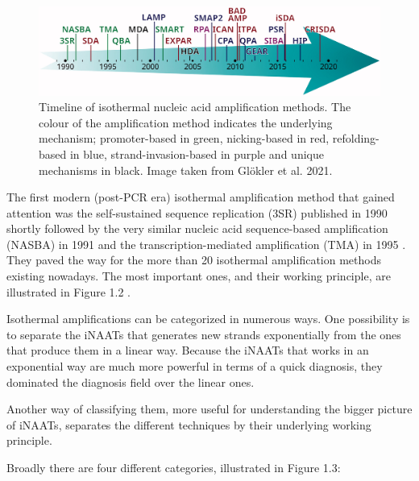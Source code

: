 \begin{figure}[b]
    \centering
    \includegraphics[width=1\textwidth]{data/iso_amp_methods.pdf}
    \caption{Timeline of isothermal nucleic acid amplification methods. The colour of the amplification method indicates the underlying mechanism; promoter-based in green, nicking-based in red, refolding-based in blue, strand-invasion-based in purple and unique mechanisms in black. Image taken from Glökler et al. 2021\cite{glokler_isothermal_2021}.}
    \label{fig:iso_amp_methods}
\end{figure}

The first modern (post-PCR era) isothermal amplification method that gained attention was the self-sustained sequence replication (3SR) published in 1990 \cite{guatelli_isothermal_1990} shortly followed by the very similar nucleic acid sequence-based amplification (NASBA) in 
1991 \cite{compton_nucleic_1991} and the transcription-mediated amplification (TMA) in 1995 \cite{kacian_nucleic_1995}. They paved the way for the more than 20 isothermal amplification methods existing nowadays. The most important ones, and their working principle, are illustrated in Figure 1.2 \cite{glokler_isothermal_2021}.


Isothermal amplifications can be categorized in numerous ways. One possibility is to separate the iNAATs that generates new strands exponentially from the ones that produce them in a linear way. Because the iNAATs that works in an exponential way are much more powerful in terms of a quick diagnosis, they dominated the diagnosis field over the linear ones.

Another way of classifying them, more useful for understanding the bigger picture of iNAATs, separates the different techniques by their underlying working principle\cite{glokler_isothermal_2021}. \linebreak

Broadly there are four different categories, illustrated in Figure 1.3:

